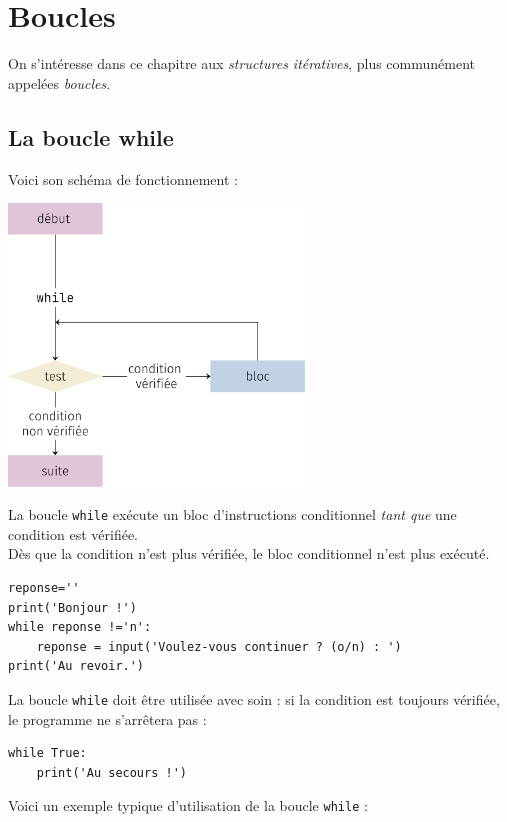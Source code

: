 \chapter{Boucles}
On s'intéresse dans ce chapitre aux \textit{structures itératives}, plus communément appelées \textit{boucles}.\\


\section{La boucle while}

Voici son schéma de fonctionnement :
\begin{center}
    \includegraphics[height=7.5cm]{ch-boucles/img/while.png}
\end{center}

La boucle \texttt{while} exécute un bloc d'instructions conditionnel \textit{tant que} une condition est vérifiée.\\
Dès que la condition n'est plus vérifiée, le bloc conditionnel n'est plus exécuté.

\begin{pyc}
\begin{verbatim}
reponse=''
print('Bonjour !')
while reponse !='n':
    reponse = input('Voulez-vous continuer ? (o/n) : ')
print('Au revoir.')
\end{verbatim}
\end{pyc}
La boucle \texttt{while} doit être utilisée avec soin : si la condition est toujours vérifiée, le programme ne s'arrêtera pas :

\begin{pyc}
\begin{verbatim}
while True:
    print('Au secours !')
\end{verbatim}
\end{pyc}
Voici un exemple typique d'utilisation de la boucle \texttt{while} : \\


